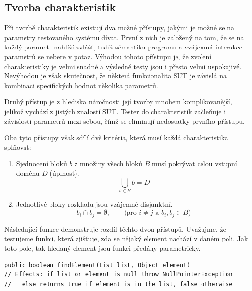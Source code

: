 \subsection*{Tvorba charakteristik}
\label{subsec_TvorbaCharakterisitk}

Při tvorbě charakteristik existují dva možné přístupy, jakými je možné se na parametry testovaného systému dívat. První z nich je založený na tom, že se na každý parametr nahlíží zvlášť, tudíž sémantika programu a vzájemná interakce parametrů se nebere v potaz. Výhodou tohoto přístupu je, že zvolení charakteristiky je velmi snadné a výsledné testy jsou i přesto velmi uspokojivé. Nevýhodou je však skutečnost, že některá funkcionalita SUT je závislá na kombinaci specifických hodnot několika parametrů. %

Druhý přístup je z hlediska náročnosti její tvorby mnohem komplikovanější, jelikož vychází z jistých znalostí SUT. Tester do charakteristik začleňuje i závislosti parametrů mezi sebou, čímž se eliminují nedostatky prvního přístupu.

Oba tyto přístupy však sdílí dvě kritéria, která musí každá charakteristika splňovat:
\begin{enumerate}
    \item Sjednocení bloků $b$ z množiny všech bloků $B$ musí pokrývat celou vstupní doménu $D$ (úplnost).
		\begin{equation}
			\bigcup_{b\in B} b = D
		\end{equation}
    \item Jednotlivé bloky rozkladu jsou vzájemně disjunktní.
		\begin{equation}
			b_i \cap b_j = \emptyset,\qquad\textrm{(pro } i \neq j \textrm{ a } b_i, b_j \in B)
		\end{equation}
\end{enumerate}

Následující funkce demonstruje rozdíl těchto dvou přístupů. Uvažujme, že testujeme funkci, která zjišťuje, zda se nějaký element nachází v daném poli. Jak toto pole, tak hledaný element jsou funkci předány parametricky. 

\begin{lstlisting}[label={lst_example}]
public boolean findElement(List list, Object element)
// Effects: if list or element is null throw NullPointerException
//   else returns true if element is in the list, false otherwise
\end{lstlisting}

